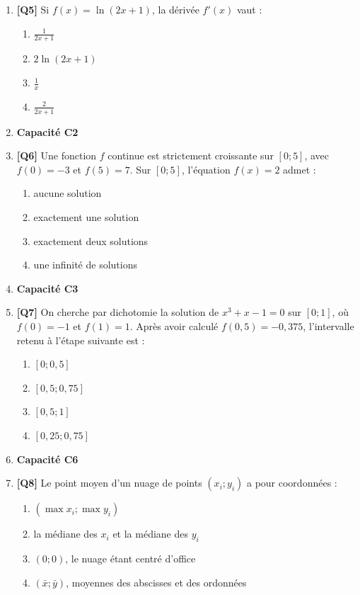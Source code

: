 \begin{enumerate}
\item \textbf{[Q5]} Si $f(x) = \ln(2x+1)$, la dérivée $f'(x)$ vaut :
  \begin{enumerate}[label=\Alph*.]
    \item $\frac{1}{2x+1}$
    \item $2 \ln(2x+1)$
    \item $\frac{1}{x}$
    \item $\frac{2}{2x+1}$
  \end{enumerate}

\item[] \textbf{Capacité C2}

\item \textbf{[Q6]} Une fonction $f$ continue est strictement croissante sur $[0;5]$, avec $f(0)=-3$ et $f(5)=7$. Sur $[0;5]$, l'équation $f(x)=2$ admet :
  \begin{enumerate}[label=\Alph*.]
    \item aucune solution
    \item exactement une solution
    \item exactement deux solutions
    \item une infinité de solutions
  \end{enumerate}

\item[] \textbf{Capacité C3}

\item \textbf{[Q7]} On cherche par dichotomie la solution de $x^3+x-1=0$ sur $[0;1]$, où $f(0)=-1$ et $f(1)=1$. Après avoir calculé $f(0{,}5)=-0{,}375$, l'intervalle retenu à l'étape suivante est :
  \begin{enumerate}[label=\Alph*.]
    \item $[0;0{,}5]$
    \item $[0{,}5;0{,}75]$
    \item $[0{,}5;1]$
    \item $[0{,}25;0{,}75]$
  \end{enumerate}

\item[] \textbf{Capacité C6}

\item \textbf{[Q8]} Le point moyen d'un nuage de points $(x_i;y_i)$ a pour coordonnées :
  \begin{enumerate}[label=\Alph*.]
    \item $(\max x_i;\max y_i)$
    \item la médiane des $x_i$ et la médiane des $y_i$
    \item $(0;0)$, le nuage étant centré d'office
    \item $(\bar x;\bar y)$, moyennes des abscisses et des ordonnées
  \end{enumerate}


\end{enumerate}
